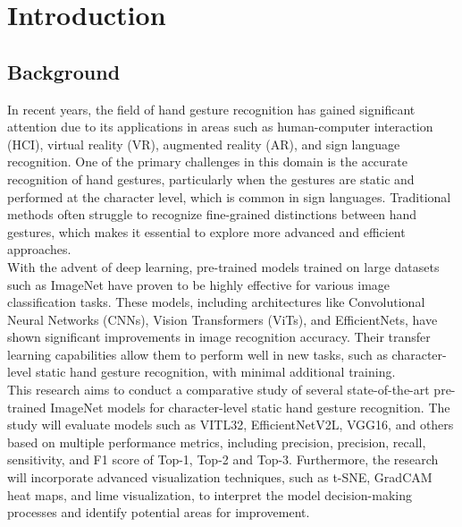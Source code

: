 \chapter{Introduction}

\section{Background}
In recent years, the field of hand gesture recognition has gained significant attention due to its applications in areas such as human-computer interaction (HCI), virtual reality (VR), augmented reality (AR), and sign language recognition. One of the primary challenges in this domain is the accurate recognition of hand gestures, particularly when the gestures are static and performed at the character level, which is common in sign languages. \cite{oyedotun2017deep} Traditional methods often struggle to recognize fine-grained distinctions between hand gestures, which makes it essential to explore more advanced and efficient approaches.\\

With the advent of deep learning, pre-trained models trained on large datasets such as ImageNet have proven to be highly effective for various image classification tasks. These models, including architectures like Convolutional Neural Networks (CNNs), Vision Transformers (ViTs), and EfficientNets, have shown significant improvements in image recognition accuracy. Their transfer learning capabilities allow them to perform well in new tasks, such as character-level static hand gesture recognition, with minimal additional training.\\

This research aims to conduct a comparative study of several state-of-the-art pre-trained ImageNet models for character-level static hand gesture recognition. The study will evaluate models such as VITL32, EfficientNetV2L, VGG16, and others based on multiple performance metrics, including precision, precision, recall, sensitivity, and F1 score of Top-1, Top-2 and Top-3. Furthermore, the research will incorporate advanced visualization techniques, such as t-SNE, GradCAM heat maps, and lime visualization, to interpret the model decision-making processes and identify potential areas for improvement.